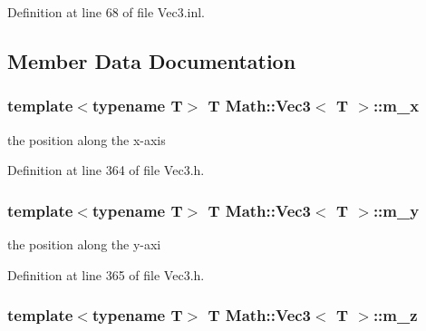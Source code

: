 Definition at line 68 of file Vec3.inl.



\subsection{Member Data Documentation}
\hypertarget{class_math_1_1_vec3_ae5fc08da4fa89bade8c10a0d21458e3d}{
\subsubsection[{m\_\-x}]{\setlength{\rightskip}{0pt plus 5cm}template$<$typename T$>$ T {\bf Math::Vec3}$<$ T $>$::{\bf m\_\-x}}}
\label{class_math_1_1_vec3_ae5fc08da4fa89bade8c10a0d21458e3d}


the position along the x-\/axis 



Definition at line 364 of file Vec3.h.

\hypertarget{class_math_1_1_vec3_adf02f4fd76cc025b128490a011f50702}{
\subsubsection[{m\_\-y}]{\setlength{\rightskip}{0pt plus 5cm}template$<$typename T$>$ T {\bf Math::Vec3}$<$ T $>$::{\bf m\_\-y}}}
\label{class_math_1_1_vec3_adf02f4fd76cc025b128490a011f50702}


the position along the y-\/axi 



Definition at line 365 of file Vec3.h.

\hypertarget{class_math_1_1_vec3_ae10650a6e5374095a3f35e53c9364c2b}{
\subsubsection[{m\_\-z}]{\setlength{\rightskip}{0pt plus 5cm}template$<$typename T$>$ T {\bf Math::Vec3}$<$ T $>$::{\bf m\_\-z}}}
\label{class_math_1_1_vec3_ae10650a6e5374095a3f35e53c9364c2b}


